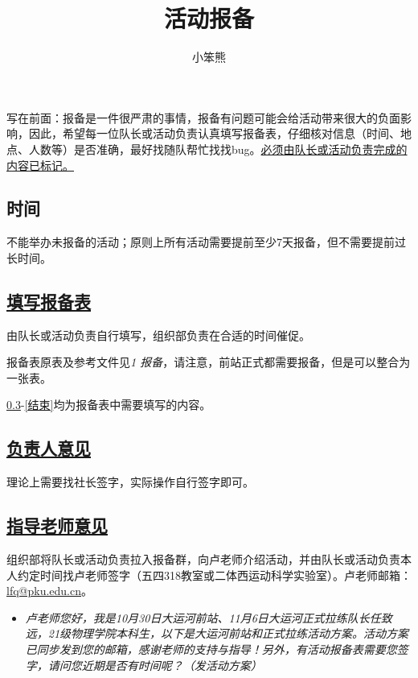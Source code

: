 \documentclass[UTF8]{ctexart}
\title{活动报备}
\author{小笨熊}
\begin{document}
\maketitle

写在前面：报备是一件很严肃的事情，报备有问题可能会给活动带来很大的负面影响，因此，希望每一位队长或活动负责认真填写报备表，仔细核对信息（时间、地点、人数等）是否准确，最好找随队帮忙找找bug。\underline{必须由队长或活动负责完成的内容已标记。}

\subsection{时间}

不能举办未报备的活动；原则上所有活动需要提前至少7天报备，但不需要提前过长时间。

\subsection[填写报备表]{\underline{填写报备表}}

由队长或活动负责自行填写，组织部负责在合适的时间催促。

报备表原表及参考文件见{\color{blue}\textit{1 报备}}，请注意，前站正式都需要报备，但是可以整合为一张表。

\ref{起始}-\ref{结束}均为报备表中需要填写的内容。

\subsection[负责人意见]{\underline{负责人意见}}\label{起始}

理论上需要找社长签字，实际操作自行签字即可。

\subsection[指导老师意见]{\underline{指导老师意见}}

组织部将队长或活动负责拉入报备群，向卢老师介绍活动，并由队长或活动负责本人约定时间找卢老师签字（五四318教室或二体西运动科学实验室）。卢老师邮箱：\href{mailto:lfq@pku.edu.cn}{lfq@pku.edu.cn}。

\begin{itemize}[nosep]
    \item[] \textit{卢老师您好，我是10月30日大运河前站、11月6日大运河正式拉练队长任致远，21级物理学院本科生，以下是大运河前站和正式拉练活动方案。活动方案已同步发到您的邮箱，感谢老师的支持与指导！另外，有活动报备表需要您签字，请问您近期是否有时间呢？（发活动方案）}
\end{itemize}
\end{document}
